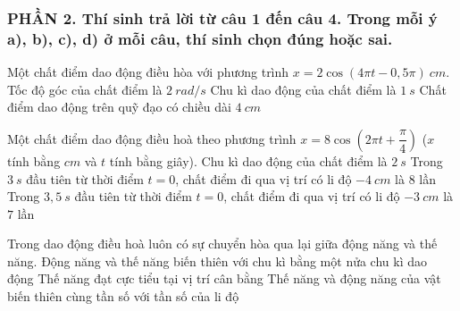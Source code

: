 \subsubsection*{PHẦN 2. Thí sinh trả lời từ câu 1 đến câu 4. Trong mỗi ý a), b), c), d) ở mỗi câu, thí sinh chọn đúng hoặc sai.}
\setcounter{ex}{0}
\begin{ex}
	Một chất điểm dao động điều hòa với phương trình $x=2 \cos (4 \pi t-0,5 \pi)\ cm$.
	{Tốc độ góc của chất điểm là $2\ rad/s$}
	{Chu kì dao động của chất điểm là $1 \ s$}
	{\True Chất điểm dao động trên quỹ đạo có chiều dài $4 \ cm$}
\end{ex}
\begin{ex}
	Một chất điểm dao động điều hoà theo phương trình $x=8 \cos \left(2 \pi t+\dfrac{\pi}{4}\right)$ ($x$ tính bằng $cm$ và $t$ tính bằng giây).
	{Chu kì dao động của chất điểm là $2 \ s$}
	{Trong $3\ s$ đầu tiên từ thời điểm $t=0$, chất điểm đi qua vị trí có li độ $-4 \ cm$ là $8$ lần}
	{\True Trong $3,5 \ s$ đầu tiên từ thời điểm $t=0$, chất điểm đi qua vị trí có li độ $-3 \ cm$ là  $7$ lần}
\end{ex}
\begin{ex}
	Trong dao động điều hoà luôn có sự chuyển hòa qua lại giữa động năng và thế năng.
	{\True Động năng và thế năng biến thiên với chu kì bằng một nửa chu kì dao động}
	{\True Thế năng đạt cực tiểu tại vị trí cân bằng}
	{Thế năng và động năng của vật biến thiên cùng tần số với tần số của li độ}
\end{ex}
